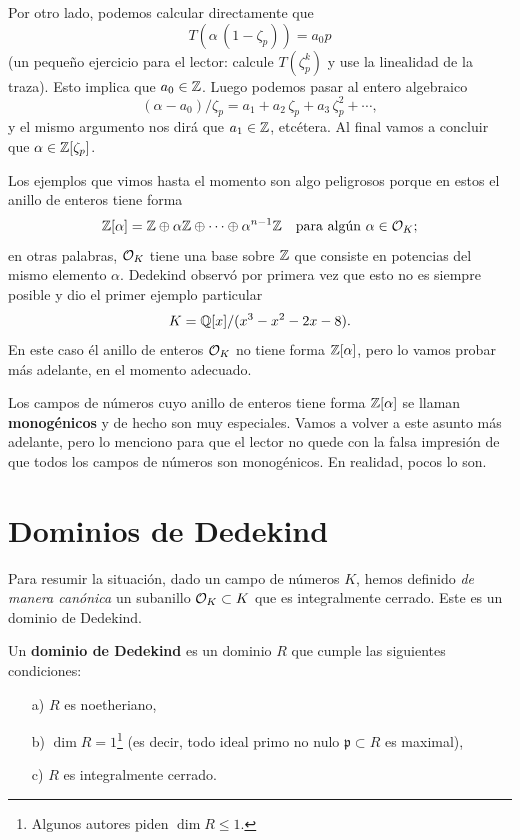 \begin{ejemplo}
  Por otro lado, podemos calcular directamente que
  $$T (\alpha \, (1 - \zeta_p)) = a_0 p$$
  (un pequeño ejercicio para el lector: calcule $T (\zeta_p^k)$ y use
  la linealidad de la traza). Esto implica que $a_0 \in \mathbb{Z}$.
  Luego podemos pasar al entero algebraico
  $$(\alpha - a_0)/\zeta_p = a_1 + a_2\,\zeta_p + a_3\,\zeta_p^2 + \cdots,$$
  y el mismo argumento nos dirá que $a_1 \in \mathbb{Z}$, etcétera.
  Al final vamos a concluir que $\alpha \in \mathbb{Z} [\zeta_p]$.
\end{ejemplo}

\begin{advertencia}
  Los ejemplos que vimos hasta el momento son algo peligrosos porque en estos
  el anillo de enteros tiene forma
  \[ \mathbb{Z} [\alpha] = \mathbb{Z} \oplus \alpha \mathbb{Z} \oplus \cdots \oplus \alpha^{n-1} \mathbb{Z}
         \quad\text{para algún }\alpha \in \mathcal{O}_K; \]
  en otras palabras, $\mathcal{O}_K$ tiene una base sobre $\mathbb{Z}$ que consiste en potencias
  del mismo elemento $\alpha$. Dedekind observó por primera vez que esto no es
  siempre posible y dio el primer ejemplo particular
  $$K = \mathbb{Q} [x]/(x^3-x^2-2x-8).$$
  En este caso él anillo de enteros $\mathcal{O}_K$ no tiene forma $\mathbb{Z} [\alpha]$, pero
  lo vamos probar más adelante, en el momento adecuado.

  Los campos de números cuyo anillo de enteros tiene forma $\mathbb{Z} [\alpha]$
  se llaman \textbf{monogénicos} y de hecho son muy especiales. Vamos a volver
  a este asunto más adelante, pero lo menciono para que el lector no quede con
  la falsa impresión de que todos los campos de números son monogénicos.
  En realidad, pocos lo son.
\end{advertencia}


\section{Dominios de Dedekind}

Para resumir la situación, dado un campo de números $K$, hemos definido
\emph{de manera canónica} un subanillo $\mathcal{O}_K \subset K$ que es integralmente
cerrado. Este es un dominio de Dedekind.

\begin{definicion}
  Un \textbf{dominio de Dedekind} es un dominio $R$ que cumple las siguientes
  condiciones:
  \begin{enumerate}
  \item[a)] $R$ es noetheriano,

  \item[b)] $\dim R = 1$\footnote{Algunos autores piden $\dim R \le 1$.}
    (es decir, todo ideal primo no nulo $\mathfrak{p}\subset R$ es maximal),

  \item[c)] $R$ es integralmente cerrado.
  \end{enumerate}
\end{definicion}


